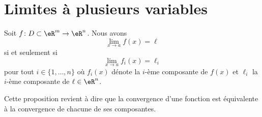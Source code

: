 \section{Limites à plusieurs variables}

\begin{proposition}	\label{PropLimParcompos}
	Soit \( f\colon D\subset\eR^m\to \eR^n\). Nous avons
	\begin{equation}
		\lim_{x\to a} f(x)=\ell
	\end{equation}
	si et seulement si
	\begin{equation}
		\lim_{x\to a} f_i(x)=\ell_i
	\end{equation}
	pour tout \( i\in\{ 1,\ldots,n \}\) où \( f_i(x)\) dénote la \( i\)-ème composante de \( f(x)\) et \( \ell_i\) la \( i\)-ème composante de \( \ell\in\eR^n\).
\end{proposition}
Cette proposition revient à dire que la convergence d'une fonction est équivalente à la convergence de chacune de ses composantes.


